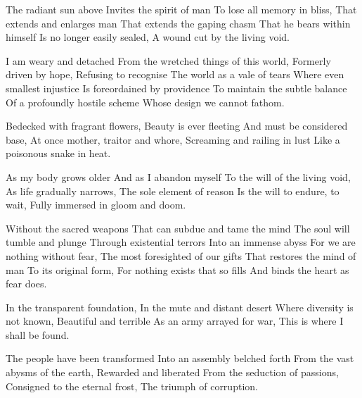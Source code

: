 \documentclass{article}
\newenvironment{stanza}{\begin{minipage}{10cm}\obeylines}{\end{minipage}\vspace{\baselineskip}}
\begin{document}
\begin{stanza}
The radiant sun above
Invites the spirit of man
To lose all memory in bliss,
That extends and enlarges man
That extends the gaping chasm
That he bears within himself
Is no longer easily sealed,
A wound cut by the living void.
\end{stanza}

\begin{stanza}
I am weary and detached
From the wretched things of this world,
Formerly driven by hope,
Refusing to recognise
The world as a vale of tears
Where even smallest injustice
Is foreordained by providence
To maintain the subtle balance
Of a profoundly hostile scheme
Whose design we cannot fathom.
\end{stanza}

\begin{stanza}
Bedecked with fragrant flowers,
Beauty is ever fleeting
And must be considered base,
At once mother, traitor and whore,
Screaming and railing in lust
Like a poisonous snake in heat.
\end{stanza}

\begin{stanza}
As my body grows older
And as I abandon myself
To the will of the living void,
As life gradually narrows,
The sole element of reason
Is the will to endure, to wait,
Fully immersed in gloom and doom.
\end{stanza}

\begin{stanza}
Without the sacred weapons
That can subdue and tame the mind
The soul will tumble and plunge
Through existential terrors
Into an immense abyss
For we are nothing without fear,
The most foresighted of our gifts
That restores the mind of man
To its original form,
For nothing exists that so fills
And binds the heart as fear does.
\end{stanza}

\begin{stanza}
In the transparent foundation,
In the mute and distant desert
Where diversity is not known,
Beautiful and terrible
As an army arrayed for war,
This is where I shall be found.
\end{stanza}

\begin{stanza}
The people have been transformed
Into an assembly belched forth
From the vast abysms of the earth,
Rewarded and liberated
From the seduction of passions,
Consigned to the eternal frost,
The triumph of corruption.
\end{stanza}
\end{document}
